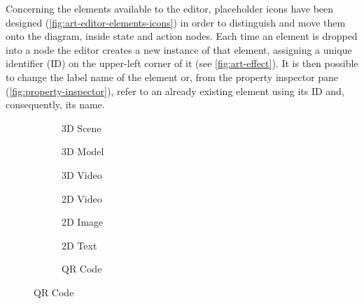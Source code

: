Concerning the elements available to the editor, placeholder icons have been designed (\autoref{fig:art-editor-elements-icons}) in order to distinguish and move them onto the diagram, inside state and action nodes. Each time an element is dropped into a node the editor creates a new instance of that element, assigning a unique identifier (ID) on the upper-left corner of it (see \autoref{fig:art-effect}). It is then possible to change the label name of the element or, from the property inspector pane (\autoref{fig:property-inspector}), refer to an already existing element using its ID and, consequently, its name.
\begin{figure}[htbp]
    \hfill
    \begin{subfigure}{0.18\textwidth}
        
        \caption{3D Scene}
    \end{subfigure}
    \hfill
    \begin{subfigure}{0.18\textwidth}
        
        \caption{3D Model}
    \end{subfigure}
    \hfill
    \begin{subfigure}{0.18\textwidth}
        
        \caption{3D Video}
    \end{subfigure}
    \hfill
    \begin{subfigure}{0.18\textwidth}
        
        \caption{2D Video}
    \end{subfigure}
    \hfill
    \begin{subfigure}{0.18\textwidth}
        
        \caption{2D Image}
    \end{subfigure}
    \hfill
    \begin{subfigure}{0.18\textwidth}
        
        \caption{2D Text}
    \end{subfigure}
    \hfill
    \begin{subfigure}{0.18\textwidth}
        
        \caption{QR Code}
    \end{subfigure}
    \hfill

\end{figure}
